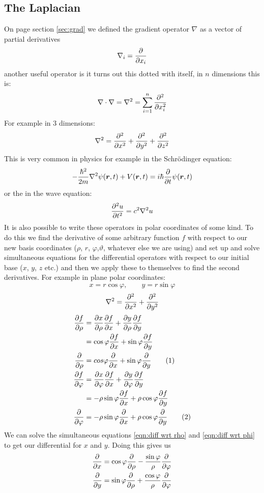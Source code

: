 \documentclass{article}
\renewcommand{\grad}{\nabla}
\begin{document}
    \subsection{The Laplacian}
    On page \pageref{sec:grad} section \ref{sec:grad} we defined the gradient operator \(\grad\) as a vector of partial derivatives
    \[\grad_i = \pdv{x_i}\]
    another useful operator is it turns out this dotted with itself, in \(n\) dimensions this is:
    \[\grad\cdot\grad = \laplacian = \sum_{i = 1}^{n} \pdv[2]{x_i}\]
    For example in 3 dimensions:
    \[\laplacian = \pdv[2]{x} + \pdv[2]{y} + \pdv[2]{z}\]
    This is very common in physics for example in the Schr\"odinger equation:
    \[-\frac{\hbar^2}{2m}\laplacian \psi(\vv r, t) + V(\vv r, t) = i\hbar \pdv{t}\psi(\vv r, t)\]
    or the in the wave equation:
    \[\pdv[2]{u}{t} = c^2\laplacian u\]
    It is also possible to write these operators in polar coordinates of some kind.
    To do this we find the derivative of some arbitrary function \(f\) with respect to our new basis coordinates (\(\rho\), \(r\), \(\varphi\),\(\vartheta\), whatever else we are using) and set up and solve simultaneous equations for the differential operators with respect to our initial base (\(x\), \(y\), \(z\) etc.) and then we apply these to themselves to find the second derivatives.
    For example in plane polar coordinates:
    \[x = r\cos\varphi,\qquad y = r\sin\varphi\]
    \[\laplacian = \pdv[2]{x} + \pdv[2]{y}\]
    \begin{align*}
        \pdv{f}{\rho} &= \pdv{x}{\rho}\pdv{f}{x} + \pdv{y}{\rho}\pdv{f}{y}\\
        &= \cos\varphi\pdv{f}{x} + \sin\varphi\pdv{f}{y}\\
        \pdv{\rho} &= cos\varphi\pdv{x} + \sin\varphi\pdv{y}\stepcounter{equation}\tag{\theequation}\label{eqn:diff wrt rho}\\
        \pdv{f}{\varphi} &= \pdv{x}{\varphi}\pdv{f}{x} + \pdv{y}{\varphi}\pdv{f}{y}\\
        &= -\rho\sin\varphi \pdv{f}{x} + \rho\cos\varphi\pdv{f}{y}\\
        \pdv{\varphi} &= -\rho\sin\varphi \pdv{x} + \rho\cos\varphi\pdv{y}\stepcounter{equation}\tag{\theequation}\label{eqn:diff wrt phi}
    \end{align*}
    We can solve the simultaneous equations \ref{eqn:diff wrt rho} and \ref{eqn:diff wrt phi} to get our differential for \(x\) and \(y\).
    Doing this gives us
    \begin{align*}
        \pdv{x} &= \cos\varphi\pdv{\rho} - \frac{\sin\varphi}{\rho}\pdv{\varphi}\\
        \pdv{y} &= \sin\varphi\pdv{\rho} + \frac{\cos\varphi}{\rho}\pdv{\varphi}
    \end{align*}
\end{document}
